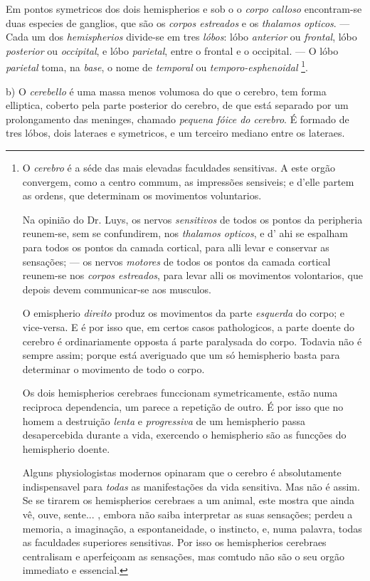 Em pontos symetricos dos dois hemispherios e sob o o \emph{corpo calloso} encontram-se duas especies de ganglios, que são os \emph{corpos estreados} e os \emph{thalamos opticos}. --- Cada um dos   \emph{hemispherios} divide-se em tres \emph{lóbos}: lóbo \emph{anterior} ou \emph{frontal}, lóbo \emph{posterior} ou \emph{occipital}, e lóbo \emph{parietal}, entre o frontal e o occipital. --- O lóbo \emph{parietal} toma, na \emph{base}, o nome de \emph{temporal} ou \emph{temporo-esphenoidal} \footnote{O \emph{cerebro} é a séde das mais elevadas faculdades sensitivas. A este orgão convergem, como a centro commum, as impressões sensiveis; e d'elle partem as ordens, que determinam os movimentos voluntarios.\par Na opinião do Dr. Luys, os nervos \emph{sensitivos} de todos os pontos da peripheria reunem-se, sem se confundirem, nos \emph{thalamos opticos}, e d' ahi se espalham para todos os pontos da camada cortical, para alli levar e conservar as sensações; --- os nervos \emph{motores} de todos os pontos da camada cortical reunem-se nos \emph{corpos estreados}, para levar alli os movimentos volontarios, que depois devem communicar-se aos musculos.\par O emispherio \emph{direito} produz os movimentos da parte \emph{esquerda} do corpo; e vice-versa. E é por isso que, em certos casos pathologicos, a parte doente do cerebro é ordinariamente opposta á parte paralysada do corpo. Todavia não é sempre assim; porque está averiguado que um só hemispherio basta para determinar o movimento de todo o corpo.\par Os dois hemispherios cerebraes funccionam symetricamente, estão numa reciproca dependencia, um parece a repetição de outro. É por isso que no homem a destruição \emph{lenta} e \emph{progressiva} de um hemispherio passa desapercebida durante a vida, exercendo o hemispherio são as funcções do hemispherio doente.\par Alguns physiologistas modernos opinaram que o cerebro é absolutamente indispensavel para \emph{todas} as manifestações da vida sensitiva. Mas não é assim. Se se tirarem os hemispherios cerebraes a um animal, este mostra que ainda vê, ouve, sente... , embora não saiba interpretar as suas sensações; perdeu a memoria, a imaginação, a espontaneidade, o instincto, e, numa palavra, todas as faculdades superiores sensitivas. Por isso os hemispherios cerebraes centralisam e aperfeiçoam as sensações, mas comtudo não são o seu orgão immediato e essencial.}.

b) O \emph{cerebello} é uma massa menos volumosa do que o cerebro, tem forma elliptica, coberto pela parte posterior do cerebro, de que está separado por um prolongamento das meninges, chamado \emph{pequena fóice do cerebro}. É formado de tres lóbos, dois lateraes e symetricos, e um terceiro mediano entre os lateraes.

